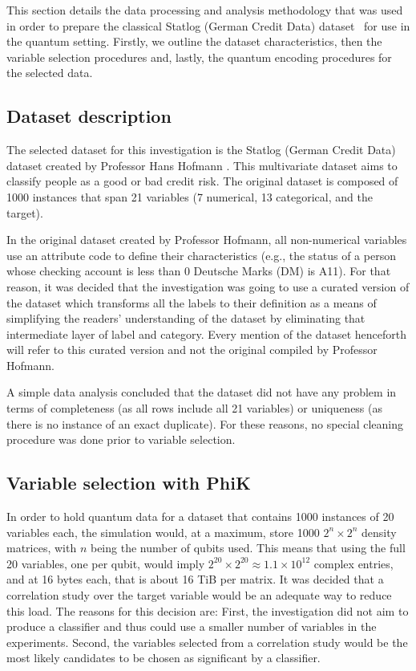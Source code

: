 \documentclass{ieeeaccess}
\begin{document}
This section details the data processing and analysis methodology that was used in order to prepare the classical Statlog (German Credit Data) dataset~\cite{hofmann1994german, germancredit2026} for use in the quantum setting. Firstly, we outline the dataset characteristics, then the variable selection procedures and, lastly, the quantum encoding procedures for the selected data.

\subsection{Dataset description}

The selected dataset for this investigation is the Statlog (German Credit Data) dataset created by Professor Hans Hofmann \cite{hofmann1994german}. This multivariate dataset aims to classify people as a good or bad credit risk. The original dataset is composed of 1000 instances that span 21 variables (7 numerical, 13 categorical, and the target).

In the original dataset created by Professor Hofmann, all non-numerical variables use an attribute code to define their characteristics (e.g., the status of a person whose checking account is less than 0 Deutsche Marks (DM) is A11). For that reason, it was decided that the investigation was going to use a curated version of the dataset \cite{germancredit2026} which transforms all the labels to their definition as a means of simplifying the readers' understanding of the dataset by eliminating that intermediate layer of label and category. Every mention of the dataset henceforth will refer to this curated version and not the original compiled by Professor Hofmann.

A simple data analysis concluded that the dataset did not have any problem in terms of completeness (as all rows include all 21 variables) or uniqueness (as there is no instance of an exact duplicate). For these reasons, no special cleaning procedure was done prior to variable selection.

\subsection{Variable selection with PhiK}
\label{subsec:var_selection}

In order to hold quantum data for a dataset that contains 1000 instances of 20 variables each, the simulation would, at a maximum, store 1000 $2^n \times 2^n$ density matrices, with $n$ being the number of qubits used. This means that using the full 20 variables, one per qubit, would imply $2^{20} \times 2^{20} \approx 1.1 \times 10^{12}$ complex entries, and at 16 bytes each, that is about 16 TiB per matrix. It was decided that a correlation study over the target variable would be an adequate way to reduce this load. The reasons for this decision are: First, the investigation did not aim to produce a classifier and thus could use a smaller number of variables in the experiments. Second, the variables selected from a correlation study would be the most likely candidates to be chosen as significant by a classifier.
\end{document}
